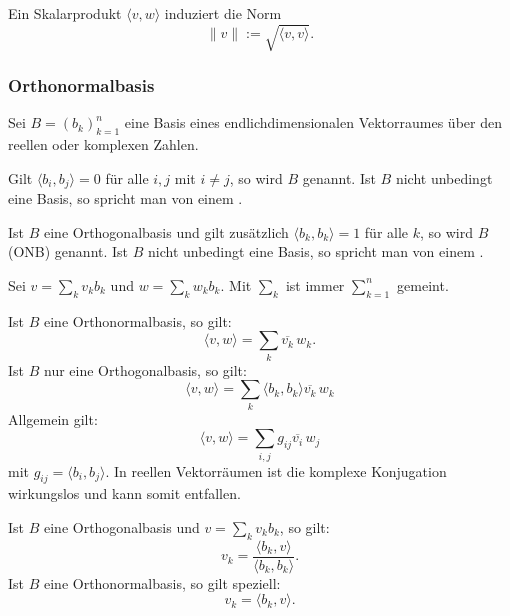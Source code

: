Ein Skalarprodukt $\langle v,w\rangle$ induziert die Norm
\begin{equation}
\|v\| := \sqrt{\langle v,v\rangle}.
\end{equation}

\subsubsection{Orthonormalbasis}\label{sec:ONB}
Sei $B=(b_k)_{k=1}^n$ eine Basis eines endlichdimensionalen
Vektorraumes über den reellen oder komplexen Zahlen.

\begin{definition}[Orthogonalbasis]\mbox{}\newline
Gilt $\langle b_i,b_j\rangle=0$
für alle $i,j$ mit $i\ne j$, so wird $B$ 
genannt. Ist $B$ nicht unbedingt eine Basis, so spricht man von einem 
.
\end{definition}

\begin{definition}[Orthonormalbasis]\mbox{}\newline
Ist $B$ eine Orthogonalbasis und gilt
zusätzlich $\langle b_k,b_k\rangle=1$ für alle $k$, so wird
$B$  (ONB) genannt. Ist $B$ nicht unbedingt
eine Basis,  so spricht man von einem .
\end{definition}

Sei $v=\sum_k v_kb_k$ und $w=\sum_k w_kb_k$.
Mit $\sum_k$ ist immer $\sum_{k=1}^n$ gemeint.

Ist $B$ eine Orthonormalbasis, so gilt:
\begin{equation}
\langle v,w\rangle = \sum_k \overline{v_k}\,w_k.
\end{equation}
Ist $B$ nur eine Orthogonalbasis, so gilt:
\begin{equation}
\langle v,w\rangle = \sum_k \langle b_k,b_k\rangle \overline{v_k}\,w_k
\end{equation}
Allgemein gilt:
\begin{equation}
\langle v,w\rangle = \sum_{i,j} g_{ij} \overline{v_i}\,w_j
\end{equation}
mit $g_{ij}=\langle b_i,b_j\rangle$. In reellen Vektorräumen
ist die komplexe Konjugation wirkungslos und kann somit entfallen.

Ist $B$ eine Orthogonalbasis und $v=\sum_k v_k b_k$, so gilt:
\begin{equation}
v_k = \frac{\langle b_k,v\rangle}{\langle b_k,b_k\rangle}.
\end{equation}
Ist $B$ eine Orthonormalbasis, so gilt speziell:
\begin{equation}
v_k = \langle b_k,v\rangle.
\end{equation}


